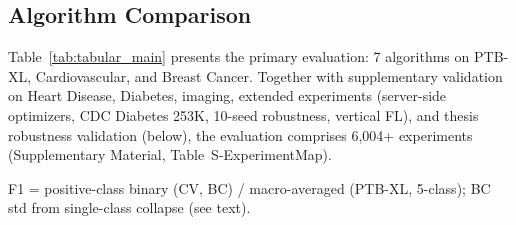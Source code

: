 \documentclass[conference]{IEEEtran}
\begin{document}
\subsection{Algorithm Comparison}

Table~\ref{tab:tabular_main} presents the primary evaluation: 7 algorithms on PTB-XL, Cardiovascular, and Breast Cancer. Together with supplementary validation on Heart Disease, Diabetes, imaging, extended experiments (server-side optimizers, CDC Diabetes 253K, 10-seed robustness, vertical FL), and thesis robustness validation (below), the evaluation comprises 6,004+ experiments (Supplementary Material, Table~S-ExperimentMap).

\begin{table}[htbp]
\centering
\caption{FL Algorithm Comparison on Real Clinical Datasets (7 Algorithms $\times$ 3 Datasets). Best accuracy per dataset in \textbf{bold}. Mean $\pm$ std over 5 seeds. PX = PTB-XL ECG (5 clients, 5-class, site-based), CV = Cardiovascular (5 clients, binary, $\alpha$=0.5), BC = Breast Cancer (3 clients, binary, $\alpha$=0.5).}
\label{tab:tabular_main}
\par{\footnotesize F1 = positive-class binary (CV, BC) / macro-averaged (PTB-XL, 5-class); BC std from single-class collapse (see text).}
\end{table}
\end{document}
